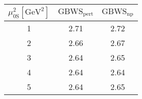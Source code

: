 \begin{tabular}{|c|c|c|}
\hline
	$\mu_{0\mathrm{S}}^2[\mathrm{GeV^2}]$ & $\mathrm{GBWS_{pert}}$ &  $\mathrm{GBWS_{np}}$\\\hline
 1 & 2.71 & 2.72 \\\hline
 2 & 2.66 & 2.67 \\\hline
 3 & 2.64 & 2.65 \\\hline
 4 & 2.64 & 2.64 \\\hline
 5 & 2.64 & 2.65 \\\hline
 \end{tabular} 
